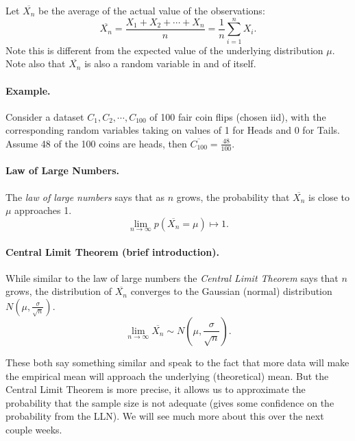 Let $\overline{X_n}$ be the average of the actual value of the observations:
\[\overline{X_n} = \frac{X_1 + X_2 + \cdots + X_n}{n} = \frac{1}{n} \sum_{i=1}^n X_i.\]
Note this is different from the expected value of the underlying distribution $\mu$.
Note also that $\overline{X_n}$ is also a random variable in and of itself. 

\paragraph{Example. }
Consider a dataset $C_1, C_2,\cdots,C_{100}$ of 100 fair coin flips (chosen iid), with the corresponding random variables 
taking on values of 1 for Heads and 0 for Tails. 
Assume 48 of the 100 coins are heads, then $\overline{C_{100}} = \frac{48}{100}$. 


\paragraph{Law of Large Numbers.} The \emph{law of large numbers} says that as $n$ grows, the probability that $\overline{X_n}$ is close to $\mu$ approaches 1. 
\[\lim_{n\rightarrow\infty} p\left(\overline{X_n}=\mu\right) \mapsto 1.\]

\paragraph{Central Limit Theorem (brief introduction).} While similar to the law of large numbers the \emph{Central Limit Theorem} says that $n$ grows, 
the distribution of $\overline{X_n}$ converges to the Gaussian (normal) distribution $N\left(\mu, \frac{\sigma}{\sqrt{n}}\right)$. 
\[\lim_{n\rightarrow\infty} \overline{X_n} \sim N\left(\mu, \frac{\sigma}{\sqrt{n}}\right).\]

These both say something similar and speak to the fact that more data will make the empirical mean will approach the underlying (theoretical) mean. 
But the Central Limit Theorem is more precise, it allows us to approximate the probability that the sample size is not adequate 
(gives some confidence on the probability from the LLN).
We will see much more about this over the next couple weeks. 



